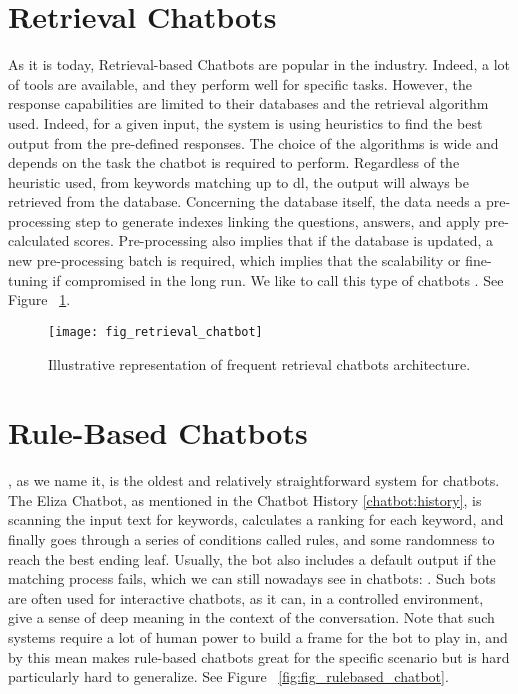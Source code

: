 \section{Retrieval Chatbots}
\label{chatbot:retrieval}
As it is today, Retrieval-based Chatbots are popular in the industry. Indeed, a lot of tools are available, and they perform well for specific tasks. However, the response capabilities are limited to their databases and the retrieval algorithm used. Indeed, for a given input, the system is using heuristics to find the best output from the pre-defined responses. The choice of the algorithms is wide and depends on the task the chatbot is required to perform. Regardless of the heuristic used, from keywords matching up to \gls{dl}, the output will always be retrieved from the database. Concerning the database itself, the data needs a pre-processing step to generate indexes linking the questions, answers, and apply pre-calculated scores. Pre-processing also implies that if the database is updated, a new pre-processing batch is required, which implies that the scalability or fine-tuning if compromised in the long run. We like to call this type of chatbots . See Figure ~\ref{fig:fig_retrieval_chatbot}.

\begin{figure}
    \centering
    \texttt{[image: fig\_retrieval\_chatbot]}
    \caption{Illustrative representation of frequent retrieval chatbots architecture.}
    \label{fig:fig_retrieval_chatbot}
\end{figure}


\section{Rule-Based Chatbots}
\label{chatbot:rulebased}
, as we name it, is the oldest and relatively straightforward system for chatbots. The Eliza\cite{website:eliza} Chatbot, as mentioned in the Chatbot History \ref{chatbot:history}, is scanning the input text for keywords, calculates a ranking for each keyword, and finally goes through a series of conditions called rules, and some randomness to reach the best ending leaf. Usually, the bot also includes a default output if the matching process fails, which we can still nowadays see in chatbots: . Such bots are often used for interactive chatbots, as it can, in a controlled environment, give a sense of deep meaning in the context of the conversation. Note that such systems require a lot of human power to build a frame for the bot to play in, and by this mean makes rule-based chatbots great for the specific scenario but is hard particularly hard to generalize. See Figure ~\ref{fig:fig_rulebased_chatbot}.

